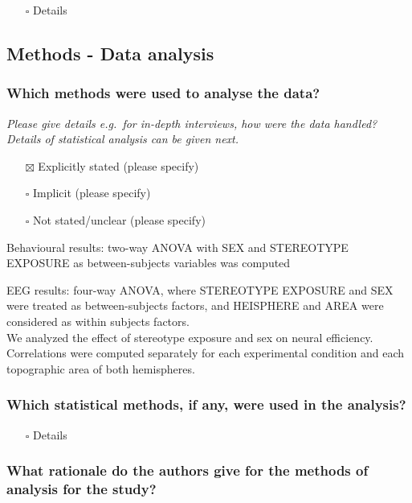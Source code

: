 \documentclass[
  doc, a4paper]{apa7}
\providecommand{\tightlist}{%
  \setlength{\itemsep}{0pt}\setlength{\parskip}{0pt}}
\begin{document}
\begin{itemize}
\tightlist
\item[$\square$]
  Details
\end{itemize}

\subsection{Methods - Data analysis}\label{methods---data-analysis}

\subsubsection{Which methods were used to analyse the data?}\label{which-methods-were-used-to-analyse-the-data}

\emph{Please give details e.g.~for in-depth interviews, how were the data handled? Details of statistical analysis can be given next.}

\begin{itemize}
\tightlist
\item[$\boxtimes$]
  Explicitly stated (please specify)
\item[$\square$]
  Implicit (please specify)
\item[$\square$]
  Not stated/unclear (please specify)
\end{itemize}

Behavioural results: two-way ANOVA with SEX and STEREOTYPE EXPOSURE as between-subjects variables was computed

EEG results: four-way ANOVA, where STEREOTYPE EXPOSURE and SEX were treated as between-subjects factors, and HEISPHERE and AREA were considered as within subjects factors.\\
We analyzed the effect of stereotype exposure and sex on neural efficiency. Correlations were computed separately for each experimental condition and each topographic area of both hemispheres.

\subsubsection{Which statistical methods, if any, were used in the analysis?}\label{which-statistical-methods-if-any-were-used-in-the-analysis}

\begin{itemize}
\tightlist
\item[$\square$]
  Details
\end{itemize}

\subsubsection{What rationale do the authors give for the methods of analysis for the study?}\label{what-rationale-do-the-authors-give-for-the-methods-of-analysis-for-the-study}
\end{document}
